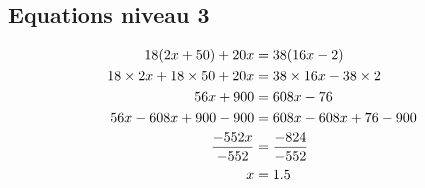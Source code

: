 \documentclass{article}%
\begin{document}
\subsection*{Equations niveau 3}%
\label{subsec:Equationsniveau3}%
\begin{align*}%
\ 18(2x + 50) + 20x &= 38(16x - 2)  \\%
\vspace{5mm}%
\newline%
\ 18 \times 2x + 18 \times 50 + 20x     &=      38 \times 16x - 38 \times 2 \\%
\vspace{5mm}%
\newline%
\ 56x + 900   &= 608x - 76 \\%
\vspace{5mm}%
\newline%
\ 56x -608x + 900 - 900   &=  608x - 608x + 76 - 900 \\%
\vspace{5mm}%
\newline%
\ \frac{-552x}{-552}   &= \frac{-824}{-552}\\%
\vspace{5mm}%
\newline%
\ x  &= 1.5\\%
\vspace{5mm}%
\newline%
\end{align*}

%
\newpage%
\end{document}
